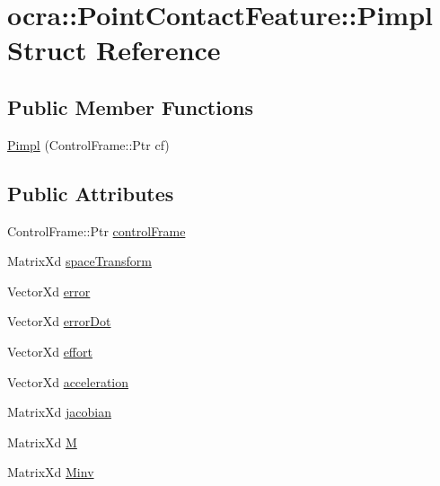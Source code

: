 \hypertarget{structocra_1_1PointContactFeature_1_1Pimpl}{}\section{ocra\+:\+:Point\+Contact\+Feature\+:\+:Pimpl Struct Reference}
\label{structocra_1_1PointContactFeature_1_1Pimpl}
\subsection*{Public Member Functions}
\begin{DoxyCompactItemize}
\item 
\hyperlink{structocra_1_1PointContactFeature_1_1Pimpl_aee2b366b499152deb1659571bb621ac8}{Pimpl} (Control\+Frame\+::\+Ptr cf)
\end{DoxyCompactItemize}
\subsection*{Public Attributes}
\begin{DoxyCompactItemize}
\item 
Control\+Frame\+::\+Ptr \hyperlink{structocra_1_1PointContactFeature_1_1Pimpl_a1988b1e00c4db34a5afdac8f92b8e542}{control\+Frame}
\item 
Matrix\+Xd \hyperlink{structocra_1_1PointContactFeature_1_1Pimpl_a2636a91b8abaabb52ac34a4121e9e115}{space\+Transform}
\item 
Vector\+Xd \hyperlink{structocra_1_1PointContactFeature_1_1Pimpl_aabf12f72f637db8c9fac8208f513ab48}{error}
\item 
Vector\+Xd \hyperlink{structocra_1_1PointContactFeature_1_1Pimpl_a9dc4c6e3ed1c44c57bf5543197eaca17}{error\+Dot}
\item 
Vector\+Xd \hyperlink{structocra_1_1PointContactFeature_1_1Pimpl_ad35d11a459c7be6bae5fe8005c734ffa}{effort}
\item 
Vector\+Xd \hyperlink{structocra_1_1PointContactFeature_1_1Pimpl_a31eac1c12e3c617613656a3efdff310c}{acceleration}
\item 
Matrix\+Xd \hyperlink{structocra_1_1PointContactFeature_1_1Pimpl_a324288a2a8620b723b27d8e4d0c54a79}{jacobian}
\item 
Matrix\+Xd \hyperlink{structocra_1_1PointContactFeature_1_1Pimpl_aa282b2bf576f7d24103a24ffbafba657}{M}
\item 
Matrix\+Xd \hyperlink{structocra_1_1PointContactFeature_1_1Pimpl_a2dfc0e883abbf6c22aace78df3677bb7}{Minv}
\end{DoxyCompactItemize}


